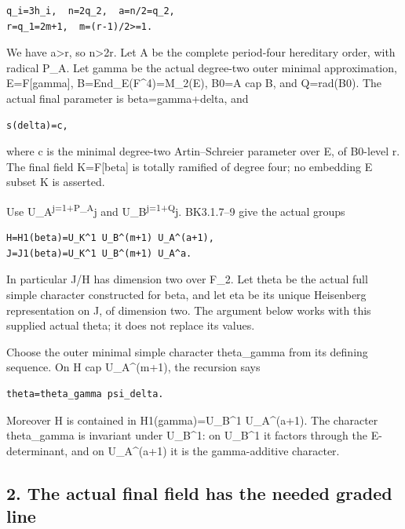 \begin{Verbatim}[fontsize=\small,breaklines=true,breakanywhere=true]
q_i=3h_i,  n=2q_2,  a=n/2=q_2,
r=q_1=2m+1,  m=(r-1)/2>=1.
\end{Verbatim}

We have a\textgreater r, so n\textgreater2r. Let A be the complete
period-four hereditary order, with radical P\_A. Let gamma be the actual
degree-two outer minimal approximation, E=F{[}gamma{]},
B=End\_E(F\^{}4)=M\_2(E), B0=A cap B, and Q=rad(B0). The actual final
parameter is beta=gamma+delta, and

\begin{Verbatim}[fontsize=\small,breaklines=true,breakanywhere=true]
s(delta)=c,
\end{Verbatim}

where c is the minimal degree-two Artin--Schreier parameter over E, of
B0-level r. The final field K=F{[}beta{]} is totally ramified of degree
four; no embedding E subset K is asserted.

Use U\_A\textsuperscript{j=1+P\_A}j and U\_B\textsuperscript{j=1+Q}j.
BK3.1.7--9 give the actual groups

\begin{Verbatim}[fontsize=\small,breaklines=true,breakanywhere=true]
H=H1(beta)=U_K^1 U_B^(m+1) U_A^(a+1),
J=J1(beta)=U_K^1 U_B^(m+1) U_A^a.
\end{Verbatim}

In particular J/H has dimension two over F\_2. Let theta be the actual
full simple character constructed for beta, and let eta be its unique
Heisenberg representation on J, of dimension two. The argument below
works with this supplied actual theta; it does not replace its values.

Choose the outer minimal simple character theta\_gamma from its defining
sequence. On H cap U\_A\^{}(m+1), the recursion says

\begin{Verbatim}[fontsize=\small,breaklines=true,breakanywhere=true]
theta=theta_gamma psi_delta.
\end{Verbatim}

Moreover H is contained in H1(gamma)=U\_B\^{}1 U\_A\^{}(a+1). The
character theta\_gamma is invariant under U\_B\^{}1: on U\_B\^{}1 it
factors through the E-determinant, and on U\_A\^{}(a+1) it is the
gamma-additive character.

\hypertarget{rank4-the-actual-final-field-has-the-needed-graded-line}{%
\subsection{2. The actual final field has the needed graded
line}\label{rank4-the-actual-final-field-has-the-needed-graded-line}}

